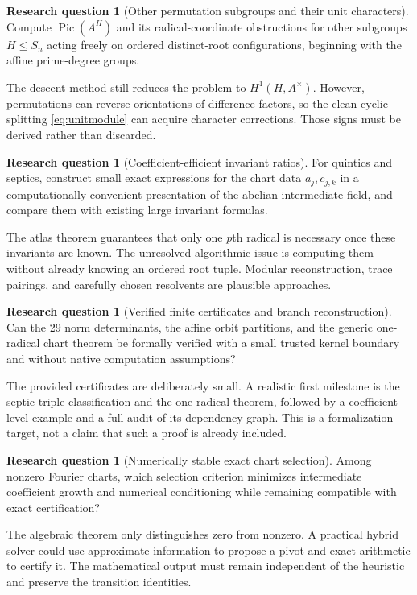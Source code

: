 \documentclass[11pt,a4paper]{article}
\theoremstyle{definition}
\newtheorem{question}[theorem]{Research question}
\theoremstyle{remark}
\newcommand{\Pic}{\operatorname{Pic}}
\begin{document}
\begin{question}[Other permutation subgroups and their unit characters]
Compute $\Pic(A^H)$ and its radical-coordinate obstructions for other
subgroups $H\leq S_n$ acting freely on ordered distinct-root
configurations, beginning with the affine prime-degree groups.
\end{question}
The descent method still reduces the problem to $H^1(H,A^\times)$.
However, permutations can reverse orientations of difference factors, so
the clean cyclic splitting \eqref{eq:unitmodule} can acquire character
corrections. Those signs must be derived rather than discarded.

\begin{question}[Coefficient-efficient invariant ratios]
For quintics and septics, construct small exact expressions for the
chart data $a_j,c_{j,k}$ in a computationally convenient presentation of
the abelian intermediate field, and compare them with existing large
invariant formulas.
\end{question}
The atlas theorem guarantees that only one $p$th radical is necessary once
these invariants are known. The unresolved algorithmic issue is computing
them without already knowing an ordered root tuple. Modular reconstruction,
trace pairings, and carefully chosen resolvents are plausible approaches.

\begin{question}[Verified finite certificates and branch reconstruction]
Can the 29 norm determinants, the affine orbit partitions, and the generic
one-radical chart theorem be formally verified with a small trusted kernel
boundary and without native computation assumptions?
\end{question}
The provided certificates are deliberately small. A realistic first
milestone is the septic triple classification and the one-radical theorem,
followed by a coefficient-level example and a full audit of its dependency
graph. This is a formalization target, not a claim that such a proof is
already included.

\begin{question}[Numerically stable exact chart selection]
Among nonzero Fourier charts, which selection criterion minimizes
intermediate coefficient growth and numerical conditioning while remaining
compatible with exact certification?
\end{question}
The algebraic theorem only distinguishes zero from nonzero. A practical
hybrid solver could use approximate information to propose a pivot and
exact arithmetic to certify it. The mathematical output must remain
independent of the heuristic and preserve the transition identities.
\end{document}
